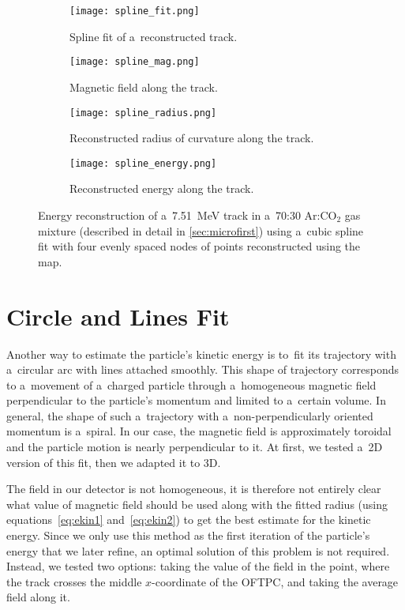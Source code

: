		\begin{figure}
			\centering
			\begin{subfigure}[t]{0.48\textwidth}
				\centering
				\texttt{[image: spline\_fit.png]}
				\caption{Spline fit of a~reconstructed track.}
			\end{subfigure}
			\hfill
			\begin{subfigure}[t]{0.48\textwidth}
				\centering
				\texttt{[image: spline\_mag.png]}
				\caption{Magnetic field along the track.}
			\end{subfigure}
			\begin{subfigure}[t]{0.48\textwidth}
				\centering
				\texttt{[image: spline\_radius.png]}
				\caption{Reconstructed radius of curvature along the track.}
			\end{subfigure}
			\hfill
			\begin{subfigure}[t]{0.48\textwidth}
				\centering
				\texttt{[image: spline\_energy.png]}
				\caption{Reconstructed energy along the track.}
			\end{subfigure}
			\caption{Energy reconstruction of a~\qty{7.51}{\MeV} track in a~70:30 Ar:CO$_2$ gas mixture (described in detail in \cref{sec:microfirst}) using a~cubic spline fit with four evenly spaced nodes of points reconstructed using the map.}
			\label{fig:spline}
		\end{figure}
	
	\section{Circle and Lines Fit}
	\label{sec:clines}
		Another way to estimate the particle's kinetic energy is to~fit its trajectory with a~circular arc with lines attached smoothly. This shape of trajectory corresponds to a~movement of a~charged particle through a~homogeneous magnetic field perpendicular to the particle's momentum and limited to a~certain volume. In general, the shape of such a~trajectory with a~non-perpendicularly oriented momentum is a~spiral. In our case, the magnetic field is approximately toroidal and the particle motion is nearly perpendicular to it. At first, we tested a~2D version of this fit, then we adapted it to 3D.
		
		The field in our detector is not homogeneous, it is therefore not entirely clear what value of magnetic field should be used along with the fitted radius (using equations~\ref{eq:ekin1} and~\ref{eq:ekin2}) to get the best estimate for the kinetic energy. Since we only use this method as the first iteration of the particle's energy that we later refine, an optimal solution of this problem is not required. Instead, we tested two options: taking the value of the field in the point, where the track crosses the middle $x$\nobreakdash-coordinate of the \ac{OFTPC}, and taking the average field along it.
		
